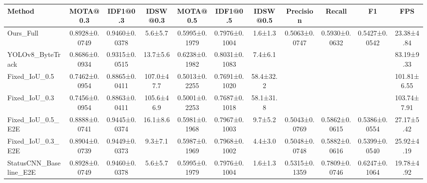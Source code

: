 \begin{tabular}{lcccccccccc}
\toprule
Method & MOTA@0.3 & IDF1@0.3 & IDSW@0.3 & MOTA@0.5 & IDF1@0.5 & IDSW@0.5 & Precision & Recall & F1 & FPS \\
\midrule
Ours_Full & 0.8928±0.0749 & 0.9460±0.0378 & 5.6±5.7 & 0.5995±0.1979 & 0.7976±0.1004 & 1.6±1.3 & 0.5063±0.0747 & 0.5930±0.0632 & 0.5427±0.0542 & 23.38±4.84 \\
YOLOv8_ByteTrack & 0.8686±0.0934 & 0.9315±0.0515 & 13.7±5.6 & 0.6238±0.1982 & 0.8031±0.1083 & 7.4±6.1 &  &  &  & 83.19±9.33 \\
Fixed_IoU_0.5 & 0.7462±0.0954 & 0.8865±0.0411 & 107.0±47.7 & 0.5013±0.2255 & 0.7691±0.1020 & 58.4±32.2 &  &  &  & 101.81±6.55 \\
Fixed_IoU_0.3 & 0.7456±0.0954 & 0.8863±0.0411 & 105.6±46.9 & 0.5001±0.2253 & 0.7687±0.1018 & 58.1±31.8 &  &  &  & 103.74±7.91 \\
Fixed_IoU_0.5_E2E & 0.8888±0.0741 & 0.9445±0.0374 & 16.1±8.6 & 0.5981±0.1968 & 0.7967±0.1003 & 9.7±5.2 & 0.5043±0.0769 & 0.5862±0.0615 & 0.5386±0.0554 & 27.17±5.42 \\
Fixed_IoU_0.3_E2E & 0.8904±0.0739 & 0.9449±0.0373 & 9.3±7.1 & 0.5987±0.1969 & 0.7968±0.1002 & 4.4±3.0 & 0.5048±0.0748 & 0.5882±0.0616 & 0.5399±0.0540 & 25.92±4.19 \\
StatusCNN_Baseline_E2E & 0.8928±0.0749 & 0.9460±0.0378 & 5.6±5.7 & 0.5995±0.1979 & 0.7976±0.1004 & 1.6±1.3 & 0.5315±0.1359 & 0.7809±0.0746 & 0.6247±0.1064 & 19.78±4.92 \\
\bottomrule
\end{tabular}
